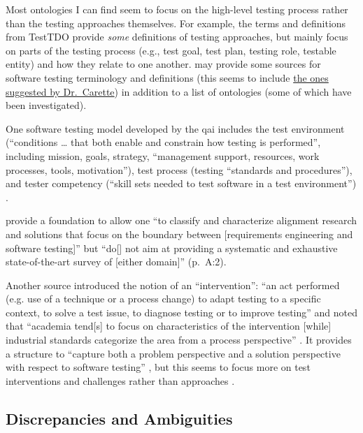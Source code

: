 Most ontologies I can find seem to focus on the high-level testing process
rather than the testing approaches themselves. For example, the terms and
definitions \citep{TebesEtAl2020b}
from TestTDO \citep{TebesEtAl2020a} provide \emph{some} definitions of
testing approaches, but mainly focus on parts of the testing process
(e.g., test goal, test plan, testing role, testable entity) and how they relate
to one another. \citet[pp.~152-153]{TebesEtAl2019} may provide some
sources for software testing terminology and definitions (this seems to include
\href{https://github.com/samm82/TestGen-Thesis/issues/14#issuecomment-1839922715}
{the ones suggested by Dr.~Carette}) in addition to a list of ontologies
(some of which have been investigated).

One software testing model developed by the \acf{qai} includes the test
environment (``conditions \dots
that both enable and constrain how testing is performed'', including mission,
goals, strategy, ``management support, resources, work processes, tools,
motivation''), test process (testing ``standards and procedures''), and tester
competency (``skill sets needed to test software in a test environment'')
\citep[pp.~5-6]{Perry2006}.

\citet{UnterkalmsteinerEtAl2014} provide a foundation to allow one ``to
classify and characterize alignment research and solutions that focus on the
boundary between [requirements engineering and software testing]'' but ``do[]
not aim at providing a systematic and exhaustive state-of-the-art survey of
      [either domain]'' (p.~A:2).

Another source
introduced the notion of an ``intervention'': ``an act performed (e.g. use of a
technique or a process change) to adapt testing
to a specific context, to solve
a test issue, to diagnose testing or to improve testing''
\citep[p.~1]{engström_mapping_2015} and noted that ``academia tend[s] to focus on
characteristics of the intervention [while] industrial standards categorize the
area from a process perspective'' \citep[p.~2]{engström_mapping_2015}.
It provides a structure to ``capture both a problem perspective and a solution
perspective with respect to software testing'' \citep[pp.~3-4]{engström_mapping_2015},
but this seems to focus more on test interventions and challenges rather than
approaches \citep[Fig.~5]{engström_mapping_2015}.

\subsection{Discrepancies and Ambiguities}


